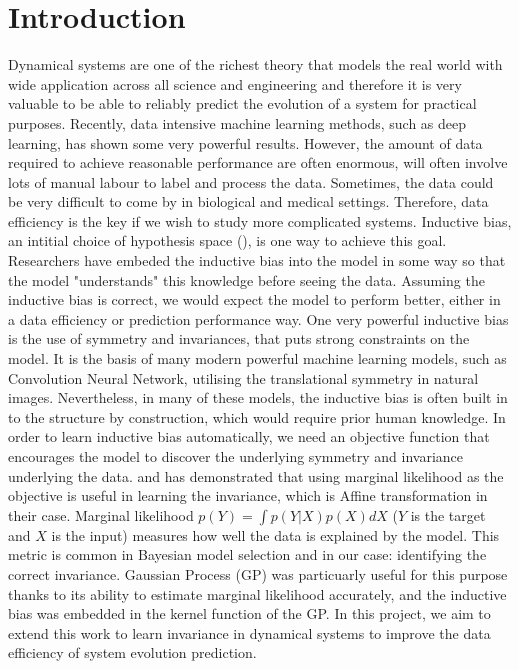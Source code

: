 \documentclass{statsmsc}
\begin{document}
\chapter{Introduction}
Dynamical systems are one of the richest theory that models the real world with wide application across all science and engineering and therefore it is very valuable to be able to reliably predict the evolution of a system for practical purposes.
Recently, data intensive machine learning methods, such as deep learning, has shown some very powerful results. 
However, the amount of data required to achieve reasonable performance are often enormous, will often involve lots of manual labour to label and process the data.
Sometimes, the data could be very difficult to come by in biological and medical settings.
Therefore, data efficiency is the key if we wish to study more complicated systems.
Inductive bias, an intitial choice of hypothesis space (\cite{Baxter2000}), is one way to achieve this goal.
Researchers have embeded the inductive bias into the model in some way so that the model "understands" this knowledge before seeing the data.
Assuming the inductive bias is correct, we would expect the model to perform better, either in a data efficiency or prediction performance way.
One very powerful inductive bias is the use of symmetry and invariances, that puts strong constraints on the model. 
It is the basis of many modern powerful machine learning models, such as Convolution Neural Network, utilising the translational symmetry in natural images.
Nevertheless, in many of these models, the inductive bias is often built in to the structure by construction, which would require prior human knowledge.
In order to learn inductive bias automatically, we need an objective function that encourages the model to discover the underlying symmetry and invariance underlying the data. 
\cite{Mark2017} and \cite{Tycho2021} has demonstrated that using marginal likelihood as the objective is useful in learning the invariance, which is Affine transformation in their case.
Marginal likelihood $p(Y)=\int p(Y|X)p(X)dX$ ($Y$ is the target and $X$ is the input) measures how well the data is explained by the model.
This metric is common in Bayesian model selection and in our case: identifying the correct invariance. 
Gaussian Process (GP) was particuarly useful for this purpose thanks to its ability to estimate marginal likelihood accurately, and the inductive bias was embedded in the kernel function of the GP.
In this project, we aim to extend this work to learn invariance in dynamical systems to improve the data efficiency of system evolution prediction.
\end{document}
